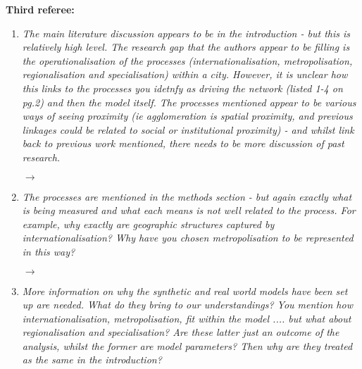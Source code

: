 \documentclass[10pt,a4paper,sans]{moderncv}        %
\begin{document}
\bigskip

\textbf{Third referee:}

\medskip


\begin{enumerate}

	\item \textit{The main literature discussion appears to be in the introduction - but this is relatively high level. The research gap that the authors appear to be filling is the operationalisation of the processes (internationalisation, metropolisation, regionalisation and specialisation) within a city. However, it is unclear how this links to the processes you idetnfy as driving the network (listed 1-4 on pg.2) and then the model itself. The processes mentioned appear to be various ways of seeing proximity (ie agglomeration is spatial proximity, and previous linkages could be related to social or institutional proximity) - and whilst link back to previous work mentioned, there needs to be more discussion of past research.}
	
	$\rightarrow$ 
	
	\medskip

	\item \textit{The processes are mentioned in the methods section - but again exactly what is being measured and what each means is not well related to the process. For example, why exactly are geographic structures captured by internationalisation? Why have you chosen metropolisation to be represented in this way?}

	$\rightarrow$ 
	
	\medskip

	\item \textit{More information on why the synthetic and real world models have been set up are needed. What do they bring to our understandings? You mention how internationalisation, metropolisation, fit within the model .... but what about regionalisation and specialisation? Are these latter just an outcome of the analysis, whilst the former are model parameters? Then why are they treated as the same in the introduction?}


\end{enumerate}
\end{document}
